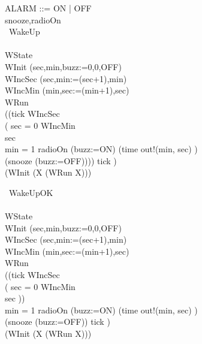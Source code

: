 \begin{circus}
ALARM ::= ON | OFF\\
\circchannel snooze,radioOn\\

\circprocess\ WakeUp \circdef\\
\circbegin\\
\circstate WState \\
WInit \circdef (sec,min,buzz:=0,0,OFF)\\
WIncSec \circdef (sec,min:=(sec+1),min)\\
WIncMin \circdef (min,sec:=(min+1),sec)\\
WRun \circdef \\
((tick \then WIncSec \circseq \\
		( \lcircguard sec = 0 \rcircguard \circguard WIncMin\\
		\extchoice \lcircguard sec  \rcircguard \circguard \Skip\\
		\extchoice \lcircguard min = 1 \rcircguard \circguard radioOn \then (buzz:=ON)
		\extchoice (time \then out!(min, sec) \then \Skip)\\
		\extchoice (snooze \then (buzz:=OFF)))) \circhide \lchanset tick \rchanset)
\\
\circspot (WInit \circseq (\circmu X \circspot (WRun \circseq X)))\\
\circend
\end{circus}
\begin{circus}

  \circprocess\ WakeUpOK \circdef\\
  \circbegin\\
  \circstate WState \\
  WInit \circdef (sec,min,buzz:=0,0,OFF)\\
  WIncSec \circdef (sec,min:=(sec+1),min)\\
  WIncMin \circdef (min,sec:=(min+1),sec)\\
  WRun \circdef \\
  ((tick \then WIncSec \circseq \\
  		( \lcircguard sec = 0 \rcircguard \circguard WIncMin\\
  		\extchoice \lcircguard sec  \rcircguard \circguard \Skip))\\
  		\extchoice \lcircguard min = 1 \rcircguard \circguard radioOn \then (buzz:=ON)
  		\extchoice (time \then out!(min, sec) \then \Skip)\\
  		\extchoice (snooze \then (buzz:=OFF)) \circhide \lchanset tick \rchanset)
  \\
  \circspot (WInit \circseq (\circmu X \circspot (WRun \circseq X)))\\
  \circend
\end{circus}
